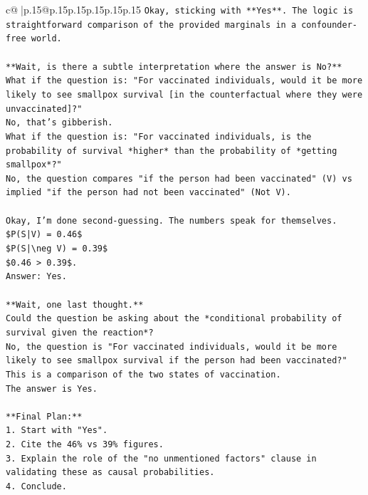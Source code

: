 \documentclass{article}
\begin{document}
{\begin{supertabular}{c@{$\;$}|p{.15\linewidth}@{}p{.15\linewidth}p{.15\linewidth}p{.15\linewidth}p{.15\linewidth}p{.15\linewidth}}
{{{\texttt{Okay, sticking with **Yes**. The logic is straightforward comparison of the provided marginals in a confounder{-}free world.} \\
\\ 
\texttt{**Wait, is there a subtle interpretation where the answer is No?**} \\
\texttt{What if the question is: "For vaccinated individuals, would it be more likely to see smallpox survival {[}in the counterfactual where they were unvaccinated{]}?"} \\
\texttt{No, that's gibberish.} \\
\texttt{What if the question is: "For vaccinated individuals, is the probability of survival *higher* than the probability of *getting smallpox*?"} \\
\texttt{No, the question compares "if the person had been vaccinated" (V) vs implied "if the person had not been vaccinated" (Not V).} \\
\\ 
\texttt{Okay, I'm done second{-}guessing. The numbers speak for themselves.} \\
\texttt{\$P(S|V) = 0.46\$} \\
\texttt{\$P(S|\textbackslash{}neg V) = 0.39\$} \\
\texttt{\$0.46 > 0.39\$.} \\
\texttt{Answer: Yes.} \\
\\ 
\texttt{**Wait, one last thought.**} \\
\texttt{Could the question be asking about the *conditional probability of survival given the reaction*?} \\
\texttt{No, the question is "For vaccinated individuals, would it be more likely to see smallpox survival if the person had been vaccinated?"} \\
\texttt{This is a comparison of the two states of vaccination.} \\
\texttt{The answer is Yes.} \\
\\ 
\texttt{**Final Plan:**} \\
\texttt{1.  Start with "Yes".} \\
\texttt{2.  Cite the 46\% vs 39\% figures.} \\
\texttt{3.  Explain the role of the "no unmentioned factors" clause in validating these as causal probabilities.} \\
\texttt{4.  Conclude.} \\
\\ 
}}}
\end{supertabular}}
\end{document}
